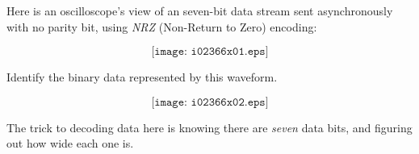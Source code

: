 

Here is an oscilloscope's view of an seven-bit data stream sent asynchronously with no parity bit, using {\it NRZ} (Non-Return to Zero) encoding:

$$\texttt{[image: i02366x01.eps]}$$

Identify the binary data represented by this waveform.







$$\texttt{[image: i02366x02.eps]}$$







The trick to decoding data here is knowing there are {\it seven} data bits, and figuring out how wide each one is.





